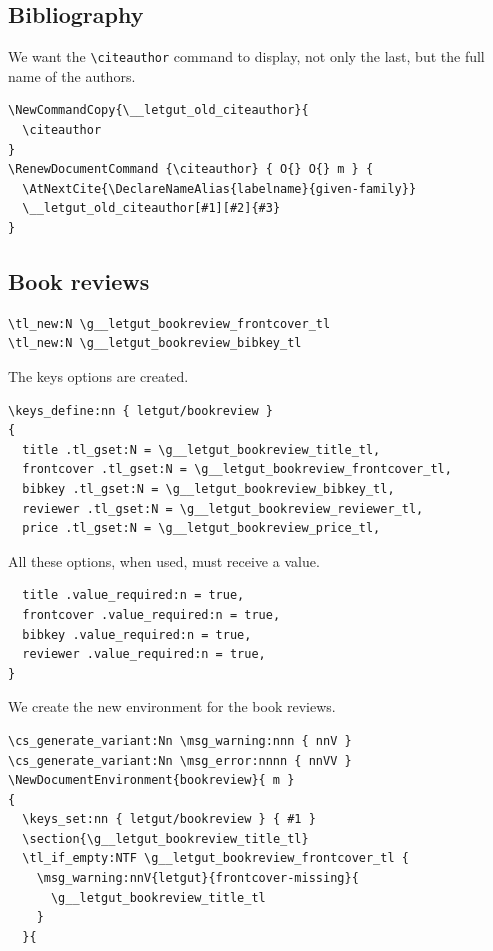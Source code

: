 \documentclass{letgut}
\begin{document}
\subsection{Bibliography}
\label{sec:orgc523238}

We want the \lstinline+\citeauthor+ command to display, not only the last, but the
full name of the authors.

\begin{lstlisting}
\NewCommandCopy{\__letgut_old_citeauthor}{
  \citeauthor
}
\RenewDocumentCommand {\citeauthor} { O{} O{} m } {
  \AtNextCite{\DeclareNameAlias{labelname}{given-family}}
  \__letgut_old_citeauthor[#1][#2]{#3}
}
\end{lstlisting}

\subsection{Book reviews}
\label{sec:org2fd9b20}

\begin{lstlisting}
\tl_new:N \g__letgut_bookreview_frontcover_tl
\tl_new:N \g__letgut_bookreview_bibkey_tl
\end{lstlisting}
The keys options are created.
\begin{lstlisting}
\keys_define:nn { letgut/bookreview }
{
  title .tl_gset:N = \g__letgut_bookreview_title_tl,
  frontcover .tl_gset:N = \g__letgut_bookreview_frontcover_tl,
  bibkey .tl_gset:N = \g__letgut_bookreview_bibkey_tl,
  reviewer .tl_gset:N = \g__letgut_bookreview_reviewer_tl,
  price .tl_gset:N = \g__letgut_bookreview_price_tl,
\end{lstlisting}

All these options, when used, must receive a value.

\begin{lstlisting}
  title .value_required:n = true,
  frontcover .value_required:n = true,
  bibkey .value_required:n = true,
  reviewer .value_required:n = true,
}
\end{lstlisting}

We create the new environment for the book reviews.

\begin{lstlisting}
\cs_generate_variant:Nn \msg_warning:nnn { nnV }
\cs_generate_variant:Nn \msg_error:nnnn { nnVV }
\NewDocumentEnvironment{bookreview}{ m }
{
  \keys_set:nn { letgut/bookreview } { #1 }
  \section{\g__letgut_bookreview_title_tl}
  \tl_if_empty:NTF \g__letgut_bookreview_frontcover_tl {
    \msg_warning:nnV{letgut}{frontcover-missing}{
      \g__letgut_bookreview_title_tl
    }
  }{
\end{lstlisting}
\end{document}
